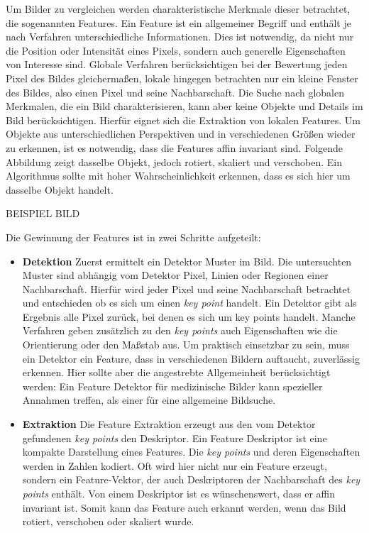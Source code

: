 Um Bilder zu vergleichen werden charakteristische Merkmale dieser betrachtet, die sogenannten Features. Ein Feature ist ein allgemeiner Begriff und enthält je nach Verfahren unterschiedliche Informationen. Dies ist notwendig, da nicht nur die Position oder Intensität eines Pixels, sondern auch generelle Eigenschaften von Interesse sind. Globale Verfahren berücksichtigen bei der Bewertung jeden Pixel des Bildes gleichermaßen, lokale hingegen betrachten nur ein kleine Fenster des Bildes, also einen Pixel und seine Nachbarschaft. Die Suche nach globalen Merkmalen, die ein Bild charakterisieren, kann aber keine Objekte und Details im Bild berücksichtigen. Hierfür eignet sich die Extraktion von lokalen Features. Um Objekte aus unterschiedlichen Perspektiven und in verschiedenen Größen wieder zu erkennen, ist es notwendig, dass die Features affin invariant sind. Folgende Abbildung zeigt dasselbe Objekt, jedoch rotiert, skaliert und verschoben. Ein Algorithmus sollte mit hoher Wahrscheinlichkeit erkennen, dass es sich hier um dasselbe Objekt handelt.

BEISPIEL BILD

Die Gewinnung der Features ist in zwei Schritte aufgeteilt: 
\begin{itemize}
	\item \textbf{Detektion} Zuerst ermittelt ein Detektor Muster im Bild. Die untersuchten Muster sind abhängig vom Detektor Pixel, Linien oder Regionen einer Nachbarschaft. Hierfür wird jeder Pixel und seine Nachbarschaft betrachtet und entschieden ob es sich um einen \textit{key point} handelt. Ein Detektor gibt als Ergebnis alle Pixel zurück, bei denen es sich um {key points} handelt. Manche Verfahren geben zusätzlich zu den \textit{key points} auch Eigenschaften wie die Orientierung oder den Maßstab aus. Um praktisch einsetzbar zu sein, muss ein Detektor ein Feature, dass in verschiedenen Bildern auftaucht, zuverlässig erkennen. Hier sollte aber die angestrebte Allgemeinheit berücksichtigt werden: Ein Feature Detektor für medizinische Bilder kann spezieller Annahmen treffen, als einer für eine allgemeine Bildsuche.
	\item \textbf{Extraktion} Die Feature Extraktion erzeugt aus den vom Detektor gefundenen \textit{key points} den Deskriptor. Ein Feature Deskriptor ist eine kompakte Darstellung eines Features. Die \textit{key points} und deren Eigenschaften werden in Zahlen kodiert. Oft wird hier nicht nur ein Feature erzeugt, sondern ein Feature-Vektor, der auch Deskriptoren der Nachbarschaft des \textit{key points} enthält. Von einem Deskriptor ist es wünschenswert, dass er affin invariant ist. Somit kann das Feature auch erkannt werden, wenn das Bild rotiert, verschoben oder skaliert wurde.
\end{itemize}

